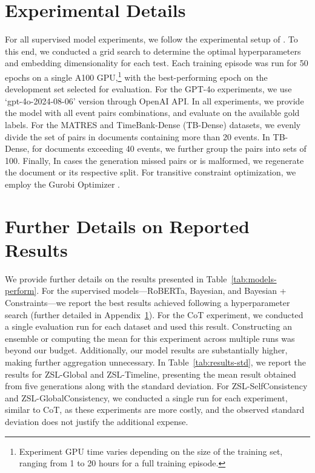 \section{Experimental Details}
\label{appx:experiment:details}

For all supervised model experiments, we follow the experimental setup of \citet{tan-etal-2023-event}. To this end, we conducted a grid search to determine the optimal hyperparameters and embedding dimensionality for each test. Each training episode was run for 50 epochs on a single A100 GPU,\footnote{Experiment GPU time varies depending on the size of the training set, ranging from 1 to 20 hours for a full training episode.} with the best-performing epoch on the development set selected for evaluation. For the GPT-4o experiments, we use `gpt-4o-2024-08-06' version through OpenAI API. In all experiments, we provide the model with all event pairs combinations, and evaluate on the available gold labels. For the MATRES and TimeBank-Dense (TB-Dense) datasets, we evenly divide the set of pairs in documents containing more than 20 events. In TB-Dense, for documents exceeding 40 events, we further group the pairs into sets of 100.
Finally, In cases the generation missed pairs or is malformed, we regenerate the document or its respective split. For transitive constraint optimization, we employ the Gurobi Optimizer \cite{gurobi}.


\section{Further Details on Reported Results}
\label{appx:main-res-details}
We provide further details on the results presented in Table~\ref{tab:models-perform}. For the supervised models—RoBERTa, Bayesian, and Bayesian + Constraints—we report the best results achieved following a hyperparameter search (further detailed in Appendix~\ref{appx:experiment:details}). 
For the CoT experiment, we conducted a single evaluation run for each dataset and used this result. Constructing an ensemble or computing the mean for this experiment across multiple runs was beyond our budget. Additionally, our model results are substantially higher, making further aggregation unnecessary. 
In Table~\ref{tab:results-std}, we report the results for ZSL-Global and ZSL-Timeline, presenting the mean result obtained from five generations along with the standard deviation. For ZSL-SelfConsistency and ZSL-GlobalConsistency, we conducted a single run for each experiment, similar to CoT, as these experiments are more costly, and the observed standard deviation does not justify the additional expense.


